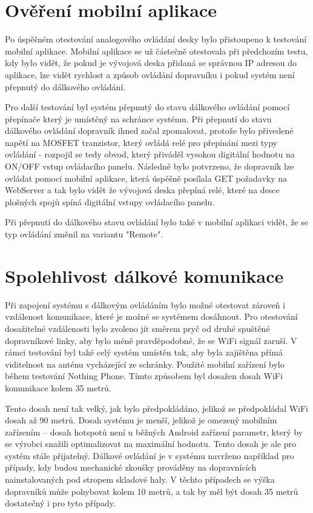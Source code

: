\section{Ověření mobilní aplikace}

Po úspěšném otestování analogového ovládání desky bylo přistoupeno k testování mobilní aplikace. Mobilní aplikace se už částečně otestovala při předchozím testu, kdy bylo vidět, že pokud je vývojová deska přidaná se správnou IP adresou do aplikace, lze vidět rychlost a způsob ovládání dopravníku i pokud systém není přepnutý do dálkového ovládání.

Pro další testování byl systém přepnutý do stavu dálkového ovládání pomocí přepínače který je umístěný na schránce systému. Při přepnutí do stavu dálkového ovládání dopravník ihned začal zpomalovat, protože bylo přivedené napětí na MOSFET tranzistor, který ovládá relé pro přepínání mezi typy ovládání - rozpojil se tedy obvod, který přiváděl vysokou digitální hodnotu na ON/OFF vstup ovládacího panelu. Následně bylo potvrzeno, že dopravník lze ovládat pomocí mobilní aplikace, která úspěšně posílala GET požadavky na WebServer a tak bylo vidět že vývojová deska přepíná relé, které na desce plošných spojů spíná digitální vstupy ovládacího panelu.

Při přepnutí do dálkového stavu ovládání bylo také v mobilní aplikaci vidět, že se typ ovládání změnil na variantu "Remote".

\section{Spolehlivost dálkové komunikace}

Při zapojení systému s dálkovým ovládáním bylo možné otestovat zároveň i vzdálenost komunikace, které je možné se systémem dosáhnout. Pro otestování dosažitelné vzdálenosti bylo zvoleno jít směrem pryč od druhé spuštěné dopravníkové linky, aby bylo méně pravděpodobné, že se WiFi signál zaruší. V rámci testování byl také celý systém umístěn tak, aby byla zajištěna přímá viditelnost na anténu vycházející ze schránky. Použité mobilní zařízení bylo během testování Nothing Phone. Tímto způsobem byl dosažen dosah WiFi komunikace kolem 35 metrů.

Tento dosah není tak velký, jak bylo předpokládáno, jelikož se předpokládal WiFi dosah až 90 metrů. Dosah systému je menší, jelikož je omezený mobilním zařízením – dosah hotspotů není u běžných Android zařízení parametr, který by se výrobci snažili optimalizovat na maximální hodnotu. Tento dosah je ale pro systém stále přijatelný. Dálkové ovládání je v systému navrženo například pro případy, kdy budou mechanické zkoušky prováděny na dopravnících nainstalovaných pod stropem skladové haly. V těchto případech se výška dopravníků může pohybovat kolem 10 metrů, a tak by měl být dosah 35 metrů dostatečný i pro tyto případy.

